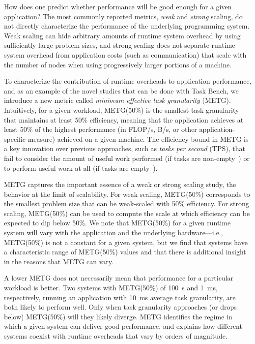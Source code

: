 How does one predict whether performance will be good enough for a given application?
The most commonly reported metrics,
\emph{weak} and \emph{strong} scaling, do not directly characterize
the performance of the underlying
programming system. Weak scaling can hide arbitrary amounts of runtime
system overhead by using sufficiently large problem sizes, and strong
scaling does not separate runtime system overhead from application costs
(such as communication) that scale with the number of nodes when
using progressively larger portions of a machine. 

To characterize the contribution of runtime overheads
to application performance, and as an example of the novel studies that can be done
with Task Bench, we introduce a new metric called
\emph{minimum effective task granularity} (METG). Intuitively, for a given
workload, METG(50\%) is the smallest task granularity that maintains
at least 50\% efficiency, meaning that the application achieves at
least 50\% of the highest performance (in FLOP/s, B/s, or other
application-specific measure) achieved on a given
machine. The efficiency bound in METG is a key innovation over
previous approaches, such as \emph{tasks per second} (TPS), that fail
to consider the amount of useful work performed (if tasks are
non-empty~\cite{Canary16, Armstrong14}) or to perform useful work at all (if tasks are empty~\cite{LegionTracing18}).

METG captures the important essence of a
weak or strong scaling study, the behavior at the limit of
scalability. For weak scaling, METG(50\%) corresponds to the
smallest problem size that can be weak-scaled with 50\%
efficiency. For strong scaling, METG(50\%) can be used to compute the
scale at which efficiency can be expected to dip below 50\%.
We note that METG(50\%) for a given runtime system will
vary with the application and the underlying hardware---i.e., METG(50\%)
is not a constant for a given system, but we find that systems have
a characteristic range of METG(50\%) values and that there is additional insight
in the reasons that METG can vary.

A lower METG does not necessarily mean that
performance for a particular workload is better. Two systems with METG(50\%) of 100~\textmu{}s and 1~ms,
respectively, running an application with 10~ms average task granularity, are both likely to perform well. Only when task
granularity approaches (or drops below) METG(50\%) will they
likely diverge. METG identifies the regime in which a
given system can deliver good performance, and explains how
different systems coexist with runtime overheads that vary by orders of magnitude.


